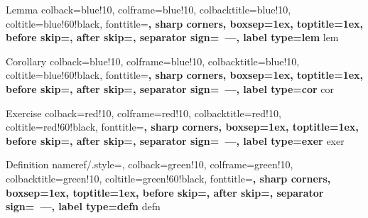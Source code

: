   {Lemma} %
  { %
    colback=blue!10,
    colframe=blue!10,
    colbacktitle=blue!10,
    coltitle=blue!60!black,
    fonttitle=\sffamily\bfseries,
    sharp corners,
    boxsep=1ex,
    toptitle=1ex,
    before skip=\baselineskip,
    after skip=\baselineskip,
    separator sign={~---},
    label type=lem
  }
  {lem} %

  {Corollary} %
  { %
    colback=blue!10,
    colframe=blue!10,
    colbacktitle=blue!10,
    coltitle=blue!60!black,
    fonttitle=\sffamily\bfseries,
    sharp corners,
    boxsep=1ex,
    toptitle=1ex,
    before skip=\baselineskip,
    after skip=\baselineskip,
    separator sign={~---},
    label type={cor}
  }
  {cor} %

  {Exercise} %
  { %
    colback=red!10,
    colframe=red!10,
    colbacktitle=red!10,
    coltitle=red!60!black,
    fonttitle=\sffamily\bfseries,
    sharp corners,
    boxsep=1ex,
    toptitle=1ex,
    before skip=\baselineskip,
    after skip=\baselineskip,
    separator sign={~---},
    label type={exer}
  }
  {exer} %

  {Definition} %
  { %
    nameref/.style={},
    colback=green!10,
    colframe=green!10,
    colbacktitle=green!10,
    coltitle=green!60!black,
    fonttitle=\sffamily\bfseries,
    sharp corners,
    boxsep=1ex,
    toptitle=1ex,
    before skip=\baselineskip,
    after skip=\baselineskip,
    separator sign={~---},
    label type={defn}
  }
  {defn} %


\makeatletter
\newenvironment{proofb}{%
  \par
  \pushQED{\qed}
  \normalfont \topsep0\p@\@plus6\p@\relax
  \trivlist
  \item[]\ignorespaces
}{%
  \popQED\endtrivlist\@endpefalse
}
\makeatother

